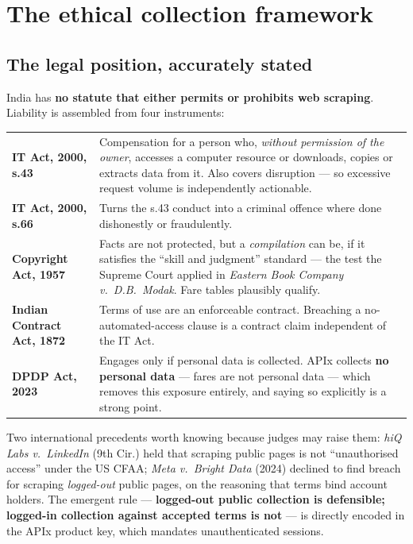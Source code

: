 \section{The ethical collection framework}
\label{sec:legal}

\subsection{The legal position, accurately stated}

India has \textbf{no statute that either permits or prohibits web scraping}. Liability is
assembled from four instruments:

\begin{center}
\footnotesize
\begin{tabularx}{\textwidth}{@{}L{4.6cm} X@{}}
\toprule
{} &  \\
\midrule
\textbf{IT Act, 2000, s.43} & Compensation for a person who, \emph{without permission of the
owner}, accesses a computer resource or downloads, copies or extracts data from it. Also
covers disruption --- so excessive request volume is independently actionable. \\
\addlinespace[2pt]
\textbf{IT Act, 2000, s.66} & Turns the s.43 conduct into a criminal offence where done
dishonestly or fraudulently. \\
\addlinespace[2pt]
\textbf{Copyright Act, 1957} & Facts are not protected, but a \emph{compilation} can be, if
it satisfies the ``skill and judgment'' standard --- the test the Supreme Court applied in
\emph{Eastern Book Company v.\ D.B.\ Modak}. Fare tables plausibly qualify. \\
\addlinespace[2pt]
\textbf{Indian Contract Act, 1872} & Terms of use are an enforceable contract. Breaching a
no-automated-access clause is a contract claim independent of the IT Act. \\
\addlinespace[2pt]
\textbf{DPDP Act, 2023} & Engages only if personal data is collected. APIx collects
\textbf{no personal data} --- fares are not personal data --- which removes this exposure
entirely, and saying so explicitly is a strong point. \\
\bottomrule
\end{tabularx}
\end{center}

\noindent Two international precedents worth knowing because judges may raise them:
\emph{hiQ Labs v.\ LinkedIn} (9th Cir.) held that scraping public pages is not
``unauthorised access'' under the US CFAA; \emph{Meta v.\ Bright Data} (2024) declined to
find breach for scraping \emph{logged-out} public pages, on the reasoning that terms bind
account holders. The emergent rule --- \textbf{logged-out public collection is defensible;
logged-in collection against accepted terms is not} --- is directly encoded in the APIx
product key, which mandates unauthenticated sessions.

